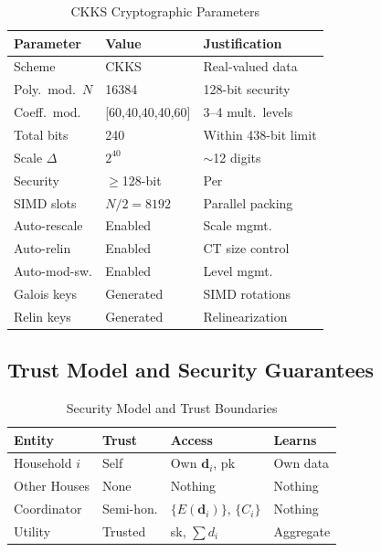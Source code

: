 \documentclass[conference,12pt]{IEEEtran}
\begin{document}
\begin{table}[H]
\centering
\caption{CKKS Cryptographic Parameters}
\label{tab:ckks_params}
\footnotesize
\begin{tabular}{@{}p{2.2cm}p{2.5cm}p{2.5cm}@{}}
\toprule
\textbf{Parameter} & \textbf{Value} & \textbf{Justification} \\
\midrule
Scheme & CKKS & Real-valued data \\
Poly.\ mod.\ $N$ & 16384 & 128-bit security \\
Coeff.\ mod. & {[60,40,40,40,60]} & 3--4 mult.\ levels \\
Total bits & 240 & Within 438-bit limit \\
Scale $\Delta$ & $2^{40}$ & $\sim$12 digits \\
Security & $\geq$128-bit & Per~\cite{HEStandard2018} \\
SIMD slots & $N/2 = 8192$ & Parallel packing \\
Auto-rescale & Enabled & Scale mgmt. \\
Auto-relin & Enabled & CT size control \\
Auto-mod-sw. & Enabled & Level mgmt. \\
Galois keys & Generated & SIMD rotations \\
Relin keys & Generated & Relinearization \\
\bottomrule
\end{tabular}
\end{table}

\subsection{Trust Model and Security Guarantees}

\begin{table}[H]
\centering
\caption{Security Model and Trust Boundaries}
\label{tab:trust_model}
\footnotesize
\begin{tabular}{@{}lp{1.3cm}p{2.2cm}p{1.8cm}@{}}
\toprule
\textbf{Entity} & \textbf{Trust} & \textbf{Access} & \textbf{Learns} \\
\midrule
Household $i$ & Self & Own $\mathbf{d}_i$, pk & Own data \\
Other Houses & None & Nothing & Nothing \\
Coordinator & Semi-hon. & $\{E(\mathbf{d}_i)\}$, $\{C_i\}$ & Nothing \\
Utility & Trusted & sk, $\sum d_i$ & Aggregate \\
\bottomrule
\end{tabular}
\end{table}
\end{document}
